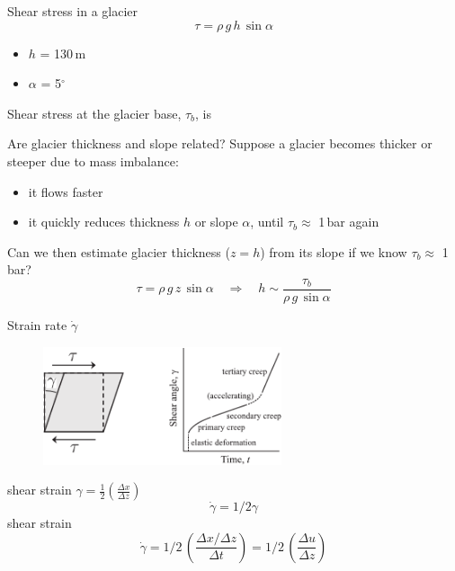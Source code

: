 \documentclass[hide notes,intlimits]{beamer}
\begin{document}
\begin{frame}{Shear stress in a glacier}
   \begin{displaymath}
     \tau = \rho\,g\,h\,\sin{\alpha}
     \end{displaymath}
     \begin{itemize}
     \item $h$ = 130\,m
     \item $\alpha$ = 5$^{\circ}$
    \end{itemize}
    Shear stress at the glacier base, $\tau_{b}$, is
\end{frame}


\begin{frame}{Are glacier thickness and slope related?}
  Suppose a glacier becomes thicker or steeper due to mass imbalance:
  \begin{itemize}
    \item it flows faster
    \item it quickly reduces thickness $h$ or slope $\alpha$, until $\tau_{b} \approx$ 1\,bar again
  \end{itemize}
  Can we then estimate glacier thickness ($z=h$) from its slope if we know $\tau_{b} \approx$ 1\,bar?
  \begin{displaymath}
    \tau = \rho\,g\,z\,\sin{\alpha} \quad \Rightarrow \quad h \sim \frac{\tau_{b}}{\rho\,g\,\sin{\alpha}}
  \end{displaymath}
\end{frame}


\begin{frame}{Strain rate $\dot\gamma$}
  \begin{figure}
  \includegraphics[width=7cm]{figures/fig_4_04}
  \end{figure}
  shear strain $\gamma = \frac{1}{2}\left( \frac{\Delta x}{\Delta z}\right)$
  \begin{displaymath}
    \dot \gamma= 1/2 \gamma
  \end{displaymath}
  shear strain 
\begin{displaymath}
\dot \gamma = 1/2\,\left( \frac{\Delta x / \Delta z}{\Delta t}\right) = 1/2\,\left( \frac{\Delta u}{\Delta z}\right)
\end{displaymath}
\end{frame}
\end{document}
